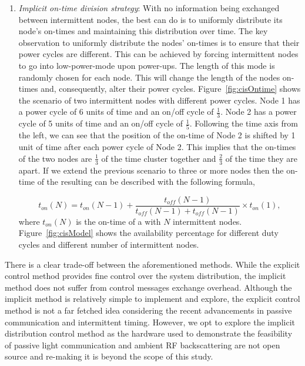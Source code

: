 \begin{enumerate}[label=\roman*.]
		\item \textit{Implicit on-time division strategy}: With no information being exchanged between intermittent nodes, the best \sys can do is to uniformly distribute its node's on-times and maintaining this distribution over time. The key observation to uniformly distribute the nodes' on-times is to ensure that their power cycles are different. This can be achieved by forcing intermittent nodes to go into low-power-mode upon power-ups. The length of this mode is randomly chosen for each node. This will change the length of the nodes on-times and, consequently, alter their power cycles. Figure~\ref{fig:cisOntime} shows the scenario of two intermittent nodes with different power cycles. Node 1 has a power cycle of 6 units of time and an on/off cycle of $\frac{1}{3}$. Node 2 has a power cycle of 5 units of time and an on/off cycle of $\frac{1}{5}$. Following the time axis from the left, we can see that the position of the on-time of Node 2 is shifted by 1 unit of time after each power cycle of Node 2. This implies that the on-times of the two nodes are $\frac{1}{3}$ of the time cluster together and $\frac{2}{3}$ of the time they are apart. If we extend the previous scenario to three or more nodes then the on-time of the resulting \sys can be described with the following formula,
				
\begin{equation}
	t_{on}(N) = t_{on}(N-1) + \frac{t_{off}(N-1)}{t_{off}(N-1)+t_{off}(N-1)} \times t_{on}(1),
		\label{eq:cisModel}
\end{equation}
where $t_{on}(N)$ is the on-time of a \sys with $N$ intermittent nodes. Figure~\ref{fig:cisModel} shows the \sys availability percentage for different duty cycles and different number of intermittent nodes.
\end{enumerate}
There is a clear trade-off between the aforementioned methods. While the explicit control method provides fine control over the system distribution, the implicit method does not suffer from control messages exchange overhead. Although the implicit method is relatively simple to implement and explore, the explicit control method is not a far fetched idea considering the recent advancements in passive communication and intermittent timing. However, we opt to explore the implicit distribution control method as the hardware used to demonstrate the feasibility of passive light communication and ambient RF backscattering are not open source and re-making it is beyond the scope of this study.

